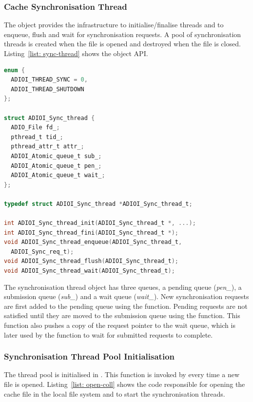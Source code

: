 \subsubsection{Cache Synchronisation Thread}
\label{subsubsec: cache-sync-thread}
The  object provides the infrastructure to initialise/finalise threads and to enqueue, flush and wait for synchronisation requests. A pool of synchronisation threads is created when the file is opened and destroyed when the file is closed. Listing~\ref{list: sync-thread} shows the object API.

\begin{lstlisting}[language=C, caption=Synchronisation Thread API, label={list: sync-thread}]
enum {
  ADIOI_THREAD_SYNC = 0,
  ADIOI_THREAD_SHUTDOWN
};

struct ADIOI_Sync_thread {
  ADIO_File fd_;
  pthread_t tid_;
  pthread_attr_t attr_;
  ADIOI_Atomic_queue_t sub_;
  ADIOI_Atomic_queue_t pen_;
  ADIOI_Atomic_queue_t wait_;
};

typedef struct ADIOI_Sync_thread *ADIOI_Sync_thread_t;

int ADIOI_Sync_thread_init(ADIOI_Sync_thread_t *, ...);
int ADIOI_Sync_thread_fini(ADIOI_Sync_thread_t *);
void ADIOI_Sync_thread_enqueue(ADIOI_Sync_thread_t, 
  ADIOI_Sync_req_t);
void ADIOI_Sync_thread_flush(ADIOI_Sync_thread_t);
void ADIOI_Sync_thread_wait(ADIOI_Sync_thread_t);
\end{lstlisting}

The synchronisation thread object has three queues, a pending queue (\textit{pen\_}), a submission queue (\textit{sub\_}) and a wait queue (\textit{wait\_}). New synchronisation requests are first added to the pending queue using the  function. Pending requests are not satisfied until they are moved to the submission queue using the  function. This function also pushes a copy of the request pointer to the wait queue, which is later used by the  function to wait for submitted requests to complete.

\subsubsection{Synchronisation Thread Pool Initialisation}
\label{subsubsec: thread-pool-init}
The thread pool is initialised in . This function is invoked by  every time a new file is opened. Listing~\ref{list: open-coll} shows the code responsible for opening the cache file in the local file system and to start the synchronisation threads.

